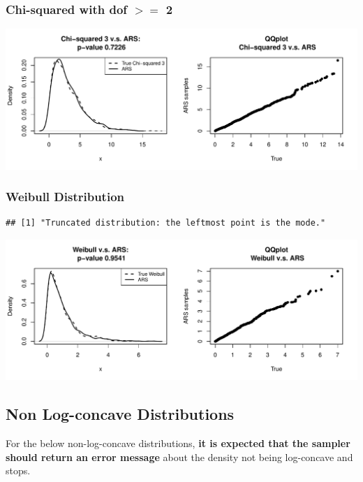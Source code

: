 \documentclass{article}\usepackage[]{graphicx}\usepackage[]{color}
\makeatletter
\def\maxwidth{ %
  \ifdim\Gin@nat@width>\linewidth
    \linewidth
  \else
    \Gin@nat@width
  \fi
}
\newenvironment{kframe}{%
 \def\at@end@of@kframe{}%
 \ifinner\ifhmode%
  \def\at@end@of@kframe{\end{minipage}}%
  \begin{minipage}{\columnwidth}%
 \fi\fi%
 \def\FrameCommand##1{\hskip\@totalleftmargin \hskip-\fboxsep
 \colorbox{shadecolor}{##1}\hskip-\fboxsep
     \hskip-\linewidth \hskip-\@totalleftmargin \hskip\columnwidth}%
 \MakeFramed {\advance\hsize-\width
   \@totalleftmargin\z@ \linewidth\hsize
   \@setminipage}}%
 {\par\unskip\endMakeFramed%
 \at@end@of@kframe}
\newenvironment{knitrout}{}{} %
\makeatother
\begin{document}
\subsubsection{Chi-squared with dof $>=$ 2}
\begin{knitrout}
\color{fgcolor}
\includegraphics[width=\maxwidth]{figure/chisq_3-1} 

\end{knitrout}

\subsubsection{Weibull Distribution}
\begin{knitrout}
\color{fgcolor}\begin{kframe}
\begin{verbatim}
## [1] "Truncated distribution: the leftmost point is the mode."
\end{verbatim}
\end{kframe}
\includegraphics[width=\maxwidth]{figure/weibull-1} 

\end{knitrout}


\subsection{Non Log-concave Distributions}
For the below non-log-concave distributions, \textbf{it is expected that the sampler
should return an error message} about the density not being log-concave and
stops.
\end{document}
